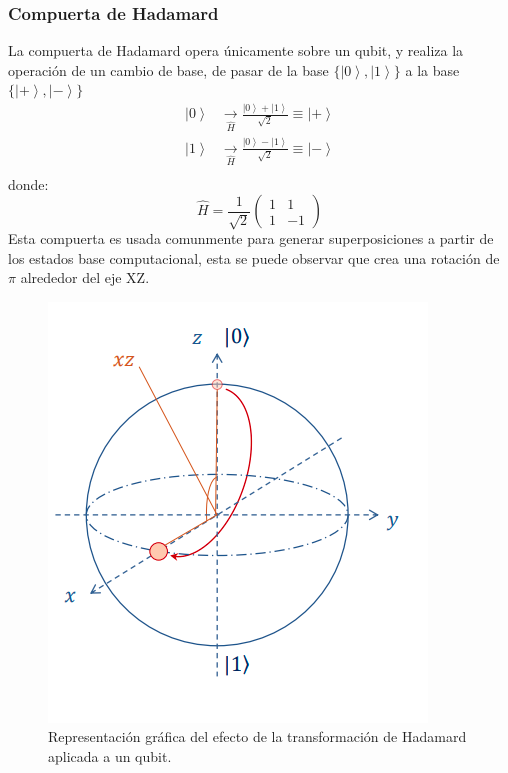 \subsubsection{Compuerta de Hadamard}
La compuerta de Hadamard opera únicamente sobre un qubit, y realiza la operación de un cambio de base, de pasar de la base $\lbrace\left| 0 \right\rangle ,\left| 1 \right\rangle\rbrace$ a la base $\lbrace\left| + \right\rangle ,\left| - \right\rangle\rbrace$
\begin{align*}
    \left| 0 \right\rangle &\underset{\hat{H}}{\rightarrow} \frac{\left| 0 \right\rangle+\left| 1\right\rangle }{\sqrt{2}} \equiv \left| + \right\rangle\\
    \left| 1 \right\rangle &\underset{\hat{H}}{\rightarrow} \frac{\left| 0 \right\rangle-\left| 1\right\rangle }{\sqrt{2}} \equiv \left| - \right\rangle\\
\end{align*}
    donde:
    \begin{equation*}
        \hat{H} = \frac{1}{\sqrt{2}} \left(\begin{matrix}
            1 & 1 \\
            1 & -1
        \end{matrix} \right)
    \end{equation*}
    Esta compuerta es usada comunmente para generar superposiciones a partir de los estados base computacional, esta se puede observar que crea una rotación de $\pi$ alrededor del eje XZ.
    \begin{figure}[H]
        \centering
        \includegraphics[scale=0.3]{images/hadamard.png}
        \caption{Representación gráfica del efecto de la transformación de Hadamard aplicada a un qubit.} 
    \end{figure}

